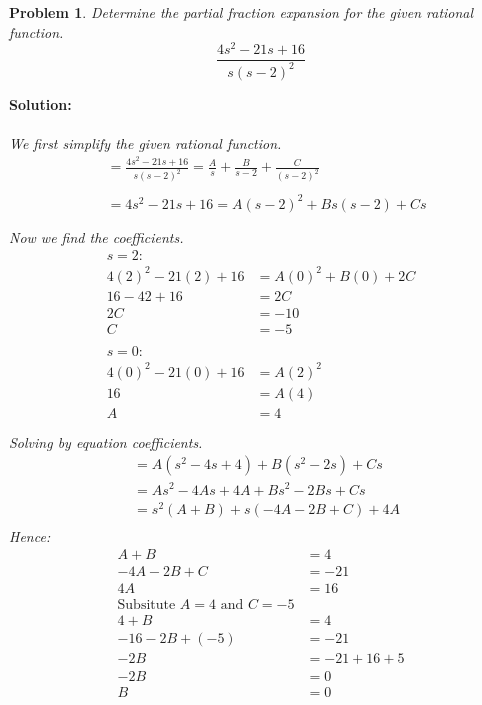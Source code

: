 \documentclass{article}
\newtheorem{problem}{Problem}
\begin{document}
    \begin{problem}
        Determine the partial fraction expansion for the given rational function. 
        \[
            \frac{4s^{2} - 21s + 16}{s(s - 2)^{2}}
        \]
    \end{problem}
    \textbf{Solution:} \\ \\
    \textit{We first simplify the given rational function.} \\
    \begin{align*}
        &= \frac{4s^{2} - 21s + 16}{s(s - 2)^{2}} = \frac{A}{s} + \frac{B}{s - 2} + \frac{C}{(s - 2)^{2}} \\ \\
        &= 4s^{2} - 21s + 16 = A(s - 2)^{2} + Bs(s - 2) + Cs \\ \\
    \end{align*}
    \textit{Now we find the coefficients.} \\
    \begin{align*}
        s = 2: \\
        4(2)^{2} - 21(2) + 16 &= A(0)^{2} + B(0) + 2C \\
        16 - 42 + 16 &= 2C \\
        2C &= -10 \\
        C &= -5 \\ \\
        s = 0: \\
        4(0)^{2} - 21(0) + 16 &= A(2)^{2} \\
        16 &= A(4) \\
        A &= 4 \\ \\
    \end{align*}
    \textit{Solving by equation coefficients.} \\
    \begin{align*}
        &= A(s^{2} - 4s + 4) + B(s^{2} - 2s) + Cs \\
        &= As^{2} - 4As + 4A + Bs^{2} - 2Bs + Cs \\
        &= s^{2}(A + B) +  s(-4A - 2B + C) + 4A \\
    \end{align*}
    \newpage
    \textit{Hence:} \\
    \begin{align*}
        A + B &= 4 \\
        -4A - 2B + C &= -21 \\
        4A &= 16 \\
    \text{Subsitute $A = 4$ and $C = -5$} \\
        4 + B &= 4 \\
        -16 - 2B + (-5) &= -21 \\
        -2B &= -21 + 16 + 5 \\
        -2B &= 0\\
        B &= 0 \\
    \end{align*} 
\end{document}
